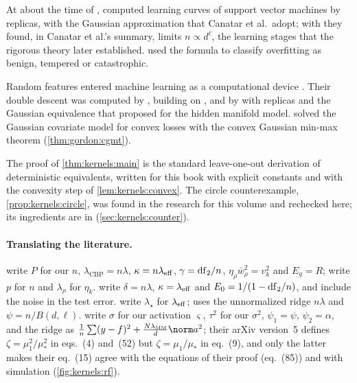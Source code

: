 \begin{refsection}
\notesandrefs
At about the time of \textcite{Sollich1998}, \textcite{DietrichEtAl1999} computed learning curves of support vector machines by replicas, with the Gaussian approximation that Canatar et al.\ adopt; with \textcite{OpperUrbanczik2001} they found, in Canatar et al.'s summary, limits $n\propto d^\ell$, the learning stages that the rigorous theory later established. \Textcite{MallinarEtAl2022} used the formula to classify overfitting as benign, tempered or catastrophic.

Random features entered machine learning as a computational device \parencite{RahimiRecht2007}. Their double descent was computed by \textcite{MeiMontanari2022}, building on \textcite{HastieEtAl2022}, and by \textcite{GeraceEtAl2020} with replicas and the Gaussian equivalence that \textcite{GoldtEtAl2020b} proposed for the hidden manifold model. \Textcite{LoureiroEtAl2022} solved the Gaussian covariate model for convex losses with the convex Gaussian min-max theorem (\cref{thm:gordon:cgmt}).

The proof of \cref{thm:kernels:main} is the standard leave-one-out derivation of deterministic equivalents, written for this book with explicit constants and with the convexity step of \cref{lem:kernels:convex}. The circle counterexample, \cref{prop:kernels:circle}, was found in the research for this volume and rechecked here; its ingredients are in \textcite{BelkinEtAl2018} (\cref{sec:kernels:counter}).

\paragraph{Translating the literature.} \Textcite{CanatarEtAl2021} write $P$ for our $n$, $\lambda_{\mathrm{CBP}}=n\lambda$, $\kappa=n\lambda_{\mathrm{eff}}$, $\gamma=\mathrm{df}_2/n$, $\eta_\rho\bar w_\rho^2=v_k^2$ and $E_g=R$; \textcite{BordelonEtAl2020} write $p$ for $n$ and $\lambda_\rho$ for $\eta_k$. \Textcite{MallinarEtAl2022} write $\delta=n\lambda$, $\kappa=\lambda_{\mathrm{eff}}$ and $E_0=1/(1-\mathrm{df}_2/n)$, and include the noise in the test error. \Textcite{ChengMontanari2024} write $\lambda_\star$ for $\lambda_{\mathrm{eff}}$; \textcite{Misiakiewicz2022} uses the unnormalized ridge $n\lambda$ and $\psi=n/B(d,\ell)$. \Textcite{MeiMontanari2022} write $\sigma$ for our activation $\varsigma$, $\tau^2$ for our $\sigma^2$, $\psi_1=\psi$, $\psi_2=\alpha$, and the ridge as $\frac1n\sum(y-f)^2+\frac{N\lambda_{\mathrm{MM}}}d\norm a^2$; their arXiv version~5 defines $\zeta=\mu_1^2/\mu_*^2$ in eqs.~(4) and~(52) but $\zeta=\mu_1/\mu_*$ in eq.~(9), and only the latter makes their eq.~(15) agree with the equations of their proof (eq.~(85)) and with simulation (\cref{fig:kernels:rf}).

\printchapterbib
\end{refsection}
